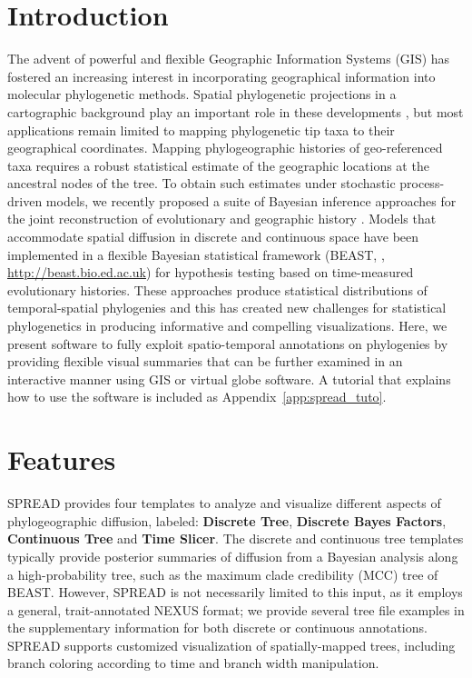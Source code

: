 \section{Introduction}

The advent of powerful and flexible Geographic Information Systems (GIS) has fostered an increasing interest in incorporating geographical information into molecular phylogenetic methods.
Spatial phylogenetic projections in a cartographic background play an important role in these developments \citep{Kidd2006, Parks2009}, but most applications remain limited to mapping phylogenetic tip taxa to their geographical coordinates.
Mapping phylogeographic histories of geo-referenced taxa requires a robust statistical estimate of the geographic locations at the ancestral nodes of the tree. 
To obtain such estimates under stochastic process-driven models, we recently proposed a suite of Bayesian inference approaches for the joint reconstruction of evolutionary and geographic history \citep{Lemey2009,Lemey2010, Bloomquist2010}.
Models that accommodate spatial diffusion in discrete and continuous space have been implemented in a flexible Bayesian statistical framework (BEAST, \cite{Drummond2007}, \url{http://beast.bio.ed.ac.uk}) for hypothesis testing based on time-measured evolutionary histories.
These approaches produce statistical distributions of temporal-spatial phylogenies and this has created new challenges for statistical phylogenetics in producing informative and compelling visualizations.
Here, we present software to fully exploit spatio-temporal annotations on phylogenies by providing flexible visual summaries that can be further examined in an interactive manner using GIS or virtual globe software.
A tutorial that explains how to use the software is included as Appendix~\ref{app:spread_tuto}.

\section{Features}

SPREAD provides four templates to analyze and visualize different aspects of phylogeographic diffusion, labeled: \textbf{Discrete Tree}, \textbf{Discrete Bayes Factors}, \textbf{Continuous Tree} and \textbf{Time Slicer}.
The discrete and continuous tree templates typically provide posterior summaries of diffusion from a Bayesian analysis along a high-probability tree, such as the maximum clade credibility (MCC) tree of BEAST. 
However, SPREAD is not necessarily limited to this input, as it employs a general, trait-annotated NEXUS format; we provide several tree file examples in the supplementary information for both discrete or continuous annotations. 
SPREAD supports customized visualization of spatially-mapped trees, including branch coloring according to time and branch width manipulation.

